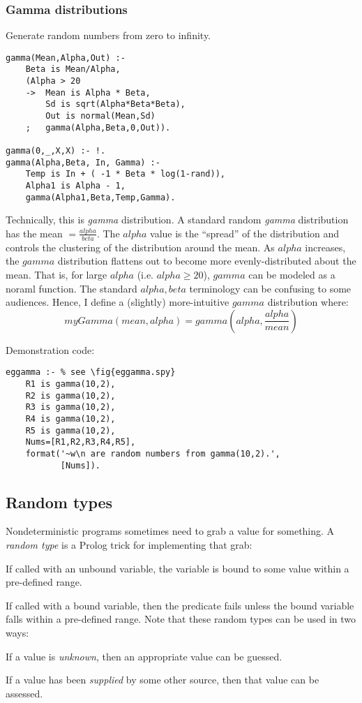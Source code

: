 \subsubsection{ Gamma distributions
}
\label{sec:gammas} 
Generate random numbers from zero to infinity.
\begin{Verbatim}
gamma(Mean,Alpha,Out) :-
    Beta is Mean/Alpha,
    (Alpha > 20
    ->  Mean is Alpha * Beta,
        Sd is sqrt(Alpha*Beta*Beta),
        Out is normal(Mean,Sd)
    ;   gamma(Alpha,Beta,0,Out)).

gamma(0,_,X,X) :- !.
gamma(Alpha,Beta, In, Gamma) :-
    Temp is In + ( -1 * Beta * log(1-rand)),
    Alpha1 is Alpha - 1,
    gamma(Alpha1,Beta,Temp,Gamma).
\end{Verbatim}
 Technically, this is {\em gamma} distribution.
A standard random {\em gamma} distribution has the mean
$=\frac{alpha}{beta}$.
The $alpha$ value is the ``spread'' of the 
distribution and controls the
clustering of  the distribution
around the mean. As
$alpha$ increases,
the $gamma$ distribution flattens out to become 
more evenly-distributed about the mean. That is, for large
$alpha$ (i.e. $alpha\ge20$), $gamma$ can be modeled as a noraml
function.
The standard $alpha,beta$ terminology can be confusing
to some audiences. Hence, I define a
(slightly) more-intuitive $gamma$
distribution where:
\[
myGamma(mean,alpha)=gamma\left(alpha,\frac{alpha}{mean}\right)
\]

Demonstration code:
\begin{Verbatim}
eggamma :- % see \fig{eggamma.spy}
    R1 is gamma(10,2),
    R2 is gamma(10,2),
    R3 is gamma(10,2),
    R4 is gamma(10,2),
    R5 is gamma(10,2),
    Nums=[R1,R2,R3,R4,R5],
    format('~w\n are random numbers from gamma(10,2).',
           [Nums]).
\end{Verbatim}
\subsection{ Random types
}

Nondeterministic programs sometimes need to grab a
value for something. A {\em random type} is a Prolog
trick for implementing that grab:
\bi
\item
If called with an unbound
variable, the variable is bound to some value within a pre-defined
range.
\item
If called with a bound variable, then the predicate fails unless
the bound variable falls within a pre-defined range.
\ei
Note that these random types can be used in two ways:
\bi
\item
If a value is {\em unknown}, then an appropriate value can be guessed.
\item
If a value has been {\em supplied} by some other source, then
that value can be assessed.
\ei

